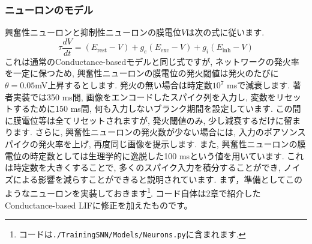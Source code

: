 \subsubsection{ニューロンのモデル}
興奮性ニューロンと抑制性ニューロンの膜電位$V$は次の式に従います. 
\begin{equation}
\tau \frac{d V}{d t}=\left(E_{\text {rest}}-V\right)+g_{e}\left(E_{\text {exc}}-V\right)+g_{i}\left(E_{\text {inh}}-V\right)    
\end{equation}
これは通常のConductance-basedモデルと同じ式ですが, ネットワークの発火率を一定に保つため, 興奮性ニューロンの膜電位の発火閾値は発火のたびに$\theta=0.05 $mV上昇するとします. 発火の無い場合は時定数$10^7$ msで減衰します. 著者実装では350 ms間, 画像をエンコードしたスパイク列を入力し, 変数をリセットするために150 ms間, 何も入力しないブランク期間を設定しています. この間に膜電位等は全てリセットされますが, 発火閾値のみ, 少し減衰するだけに留まります. さらに, 興奮性ニューロンの発火数が少ない場合には, 入力のポアソンスパイクの発火率を上げ, 再度同じ画像を提示します. 
また, 興奮性ニューロンの膜電位の時定数としては生理学的に逸脱した100 msという値を用いています. これは時定数を大きくすることで, 多くのスパイク入力を積分することができ, ノイズによる影響を減らすことができると説明されています. 
まず，準備としてこのようなニューロンを実装しておきます\footnote{コードは\texttt{./TrainingSNN/Models/Neurons.py}に含まれます. }. コード自体は2章で紹介したConductance-based LIFに修正を加えたものです。
